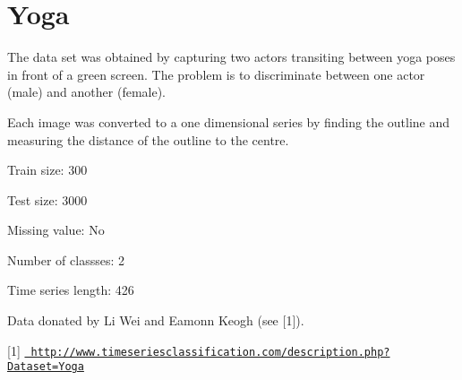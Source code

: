 \chapter{Yoga}
\hypertarget{md_external_2data_2UCRArchive__2018_2Yoga_2README}{}\label{md_external_2data_2UCRArchive__2018_2Yoga_2README}
\label{md_external_2data_2UCRArchive__2018_2Yoga_2README_autotoc_md234}%
%
 The data set was obtained by capturing two actors transiting between yoga poses in front of a green screen. The problem is to discriminate between one actor (male) and another (female).

Each image was converted to a one dimensional series by finding the outline and measuring the distance of the outline to the centre.

Train size\+: 300

Test size\+: 3000

Missing value\+: No

Number of classses\+: 2

Time series length\+: 426

Data donated by Li Wei and Eamonn Keogh (see \mbox{[}1\mbox{]}).

\mbox{[}1\mbox{]} \href{http://www.timeseriesclassification.com/description.php?Dataset=Yoga}{\texttt{ http\+://www.\+timeseriesclassification.\+com/description.\+php?\+Dataset=\+Yoga}} 